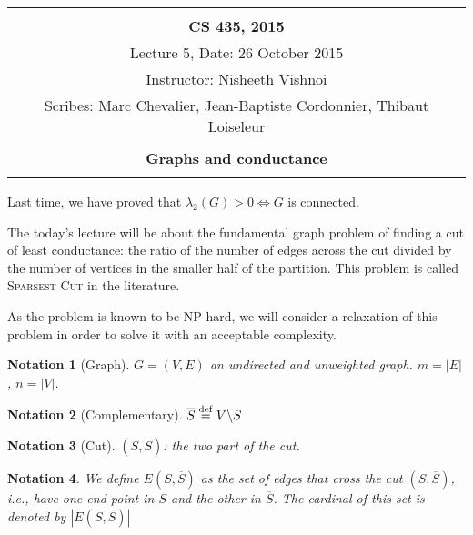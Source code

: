 \documentclass[12pt]{article}
\newtheorem{notation}{Notation}
\newcommand{\defeq}{\stackrel{{\rm def}}{=}}
\newcommand{\LRa}{\Leftrightarrow}
\newcommand{\card}[1]{\left\lvert#1\right\rvert}
\newcommand{\NP}{\textsc{NP}}
\begin{document}
\begin{center}
\begin{tabular}{|c|}
\hline
\\
{\bf CS 435, 2015} \\
 Lecture 5, Date: 26 October 2015\\
Instructor: Nisheeth Vishnoi \\
Scribes: Marc Chevalier, Jean-Baptiste Cordonnier, Thibaut Loiseleur \\ \\
{\bfseries \large Graphs and conductance} \\ \\ \hline
\end{tabular}
\end{center}


Last time, we have proved that $\lambda_2(G) > 0 \LRa G$ is connected.

The today's lecture will be about the fundamental graph problem of finding a cut of least conductance: the ratio of the number of edges across the cut divided by the number of vertices in the smaller half of the partition. This problem is called \textsc{Sparsest Cut} in the literature.

As the problem is known to be \NP-hard, we will consider a relaxation of this problem in order to solve it with an acceptable complexity.


\begin{notation}[Graph]
    $G = (V,E)$ an undirected and unweighted graph. $m=\lvert E\rvert$, $n=\lvert V\rvert$.
\end{notation}

\begin{notation}[Complementary]
    $\overline{S}\defeq V\backslash S$
\end{notation}

\begin{notation}[Cut]
    $(S,\overline{S})$: the two part of the cut.
\end{notation}
    
\begin{notation}
    We define $E(S,\overline{S})$ as the set of edges that cross the cut  $(S,\overline{S})$, i.e., have one end point in $S$ and the other in $\overline{S}$. The cardinal of this set is denoted by $\card{E(S,\overline{S})}$
\end{notation}    
    
\end{document}
